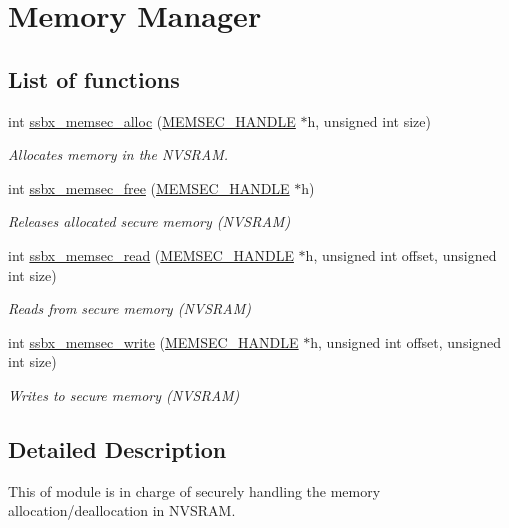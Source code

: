 \hypertarget{group__ssbx___mem}{}\section{Memory Manager}
\label{group__ssbx___mem}
\subsection*{List of functions}
\begin{DoxyCompactItemize}
\item
int \hyperlink{group__ssbx___mem_ga96810d67a710b2b5c6bdf36e8be9264d}{ssbx\+\_\+memsec\+\_\+alloc} (\hyperlink{struct_m_e_m_s_e_c___h_a_n_d_l_e}{M\+E\+M\+S\+E\+C\+\_\+\+H\+A\+N\+D\+LE} $\ast$h, unsigned int size)
\begin{DoxyCompactList}\small\item\em Allocates memory in the N\+V\+S\+R\+AM. \end{DoxyCompactList}\item
int \hyperlink{group__ssbx___mem_ga7bdb13c9e820522a2dd962852e39d17d}{ssbx\+\_\+memsec\+\_\+free} (\hyperlink{struct_m_e_m_s_e_c___h_a_n_d_l_e}{M\+E\+M\+S\+E\+C\+\_\+\+H\+A\+N\+D\+LE} $\ast$h)
\begin{DoxyCompactList}\small\item\em Releases allocated secure memory (N\+V\+S\+R\+AM) \end{DoxyCompactList}\item
int \hyperlink{group__ssbx___mem_gae2a833e9b4c47b6c2eed6cbfb53e272a}{ssbx\+\_\+memsec\+\_\+read} (\hyperlink{struct_m_e_m_s_e_c___h_a_n_d_l_e}{M\+E\+M\+S\+E\+C\+\_\+\+H\+A\+N\+D\+LE} $\ast$h, unsigned int offset, unsigned int size)
\begin{DoxyCompactList}\small\item\em Reads from secure memory (N\+V\+S\+R\+AM) \end{DoxyCompactList}\item
int \hyperlink{group__ssbx___mem_gae04ea24bdad83f4943013677e489a87b}{ssbx\+\_\+memsec\+\_\+write} (\hyperlink{struct_m_e_m_s_e_c___h_a_n_d_l_e}{M\+E\+M\+S\+E\+C\+\_\+\+H\+A\+N\+D\+LE} $\ast$h, unsigned int offset, unsigned int size)
\begin{DoxyCompactList}\small\item\em Writes to secure memory (N\+V\+S\+R\+AM) \end{DoxyCompactList}\end{DoxyCompactItemize}


\subsection{Detailed Description}
This of module is in charge of securely handling the memory allocation/deallocation in N\+V\+S\+R\+AM.

